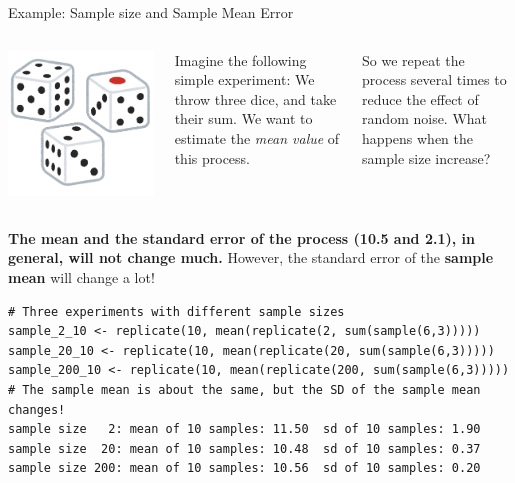 \begin{frame}[fragile]{Example: Sample size and Sample Mean Error}

  \begin{columns}
      \includegraphics[width=\textwidth]{../img/irasutoya_dice}

      Imagine the following simple experiment: We throw three dice,
      and take their sum. We want to estimate the \emph{mean value} of
      this process.\bigskip

      So we repeat the process several times to reduce
      the effect of random noise. What happens when the sample size increase?
    \end{columns}

{\bf The mean and the standard error of the process (10.5 and 2.1), in
  general, will not change much.} However, the standard error of the
{\bf sample mean} will change a lot!
  
{\smaller
\begin{verbatim}
# Three experiments with different sample sizes
sample_2_10 <- replicate(10, mean(replicate(2, sum(sample(6,3)))))
sample_20_10 <- replicate(10, mean(replicate(20, sum(sample(6,3)))))
sample_200_10 <- replicate(10, mean(replicate(200, sum(sample(6,3)))))
# The sample mean is about the same, but the SD of the sample mean changes!
sample size   2: mean of 10 samples: 11.50  sd of 10 samples: 1.90
sample size  20: mean of 10 samples: 10.48  sd of 10 samples: 0.37
sample size 200: mean of 10 samples: 10.56  sd of 10 samples: 0.20 
\end{verbatim}}
\end{frame}

